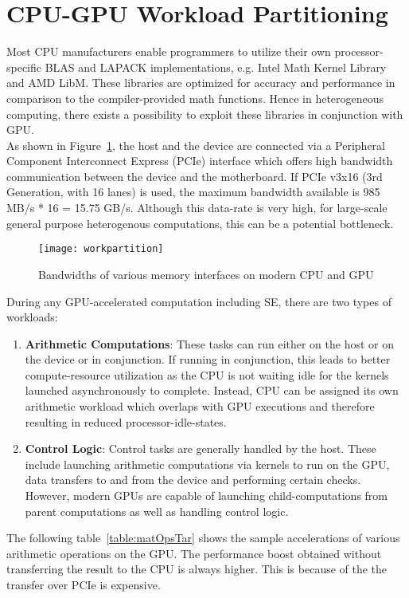 \documentclass[thesis.tex]{subfiles}
\begin{document}
\section{CPU-GPU Workload Partitioning}\label{cpugpupartitioning}
Most CPU manufacturers enable programmers to utilize their own processor-specific BLAS and LAPACK implementations, e.g. Intel Math Kernel Library and AMD LibM. These libraries are optimized for accuracy and performance in comparison to the compiler-provided math functions. Hence in heterogeneous computing, there exists a possibility to exploit these libraries in conjunction with GPU. \\
As shown in Figure~\ref{fig:workpartition}, the host and the device are connected via a Peripheral Component Interconnect Express (PCIe) interface which offers high bandwidth communication between the device and the motherboard. If PCIe v3x16 (3rd Generation, with 16 lanes) is used, the maximum bandwidth available is 985 MB/s * 16 = 15.75 GB/s. Although this data-rate is very high, for large-scale general purpose heterogenous computations, this can be a potential bottleneck. 
\begin{figure}[H]
	\centering
	\texttt{[image: workpartition]}
	\caption{Bandwidths of various memory interfaces on modern CPU and GPU}
	\label{fig:workpartition}
\end{figure}
During any GPU-accelerated computation including SE, there are two types of workloads:
\begin{enumerate}
	\item \textbf{Arithmetic Computations}:
	These tasks can run either on the host or on the device or in conjunction. If running in conjunction, this leads to better compute-resource utilization as the CPU is not waiting idle for the kernels launched asynchronously to complete. Instead, CPU can be assigned its own arithmetic workload which overlaps with GPU executions and therefore resulting in reduced processor-idle-states. 
	\item \textbf{Control Logic}:
	Control tasks are generally handled by the host. These include launching arithmetic computations via kernels to run on the GPU, data transfers to and from the device and performing certain checks. However, modern GPUs are capable of launching child-computations from parent computations as well as handling control logic.
\end{enumerate}
The following table~\ref{table:matOpsTar} shows the sample accelerations of various arithmetic operations on the GPU. The performance boost obtained without transferring the result to the CPU is always higher. This is because of the the transfer over PCIe is expensive.
\end{document}
